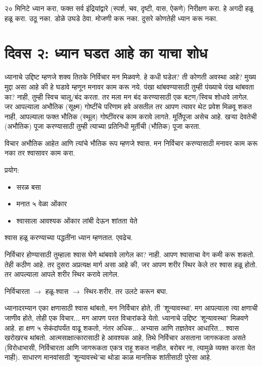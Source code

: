२० मिनिटे ध्यान करा, फक्त सर्व इंद्रियांद्वारे (स्पर्श, चव, दृष्टी, वास, ऐकणे) निरीक्षण करा. हे अगदी हळू हळू करा. उठू नका. डोळे उघडे ठेवा. मोजणी करू नका. दुसरे कोणतेही ध्यान करू नका.

\section*{दिवस २: ध्यान घडत आहे का याचा शोध}

ध्यानाचे उद्दिष्ट म्हणजे शक्य तितके निर्विचार मन मिळवणे. हे कधी घडेल? ती कोणती अवस्था आहे? मुख्य मुद्दा असा आहे की हे घडावे म्हणून मनावर काम करू नये. पंखा थांबवण्यासाठी तुम्ही पंख्याचे पंख थांबवता का? नाही, तुम्ही स्विच चालू/बंद करता. तर मला मन बंद करण्यासाठी एक बटण/स्विच शोधावे लागेल. जर आपल्याला अभौतिक (सूक्ष्म) गोष्टींचे परिणाम हवे असतील तर आपण त्यावर थेट प्रवेश मिळवू शकत नाही, आपल्याला फक्त भौतिक (स्थूल) गोष्टींवरच काम करावे लागते. मूर्तिपूजा असेच आहे. खर्‍या देवतेची (अभौतिक) पूजा करण्यासाठी तुम्ही त्याच्या प्रतिनिधी मूर्तीची (भौतिक) पूजा करता.

विचार अभौतिक आहेत आणि त्यांचे भौतिक रूप म्हणजे श्वास. मन निर्विचार करण्यासाठी मनावर काम करू नका तर श्वासावर काम करा.

प्रयोग:
\begin{itemize}
 \item सरळ बसा
 \item मनात ५ वेळा ओंकार
 \item श्वासाला आवश्यक ओंकार लांबी देऊन शांतता येते
\end{itemize}

श्वास हळू करण्याच्या पद्धतींना ध्यान म्हणतात. एवढेच.

निर्विचार होण्यासाठी तुम्हाला श्वास घेणे थांबवावे लागेल का? नाही. आपण श्वासाचा वेग कमी करू शकतो. तेही कठीण आहे. तर दुसरा अप्रत्यक्ष मार्ग असा आहे की, जर आपण शरीर स्थिर केले तर श्वास हळू होतो. तर आपल्याला आपले शरीर स्थिर करावे लागेल.

निर्विचारता $\rightarrow$ हळू-श्वास $\rightarrow$ स्थिर-शरीर. तर उलटे करून बघा.

ध्यानादरम्यान एका क्षणासाठी श्वास थांबतो, मन निर्विचार होते, ती 'शून्यावस्था'. मग आपल्याला त्या क्षणाची जाणीव होते, तोही एक विचार... मग आपण परत विचारांकडे येतो. ध्यानाचे उद्दिष्ट 'शून्यावस्था' मिळवणे आहे. हा क्षण ५ सेकंदांपर्यंत वाढू शकतो, नंतर अधिक... अभ्यास आणि तज्ञतेवर आधारित... श्वास खरोखरच थांबतो. आत्मसाक्षात्कारासाठी हे आवश्यक आहे, तिथे निर्विचार असताना जागरूकता असते (विरोधाभासी, निर्विचारता आणि जागरूकता एकत्र राहू शकत नाहीत, बरोबर ना, त्यामुळे व्यक्त करता येत नाही). साधारण मानवांसाठी 'शून्यावस्थे'चा थोडा काळ मानसिक शांतीसाठी पुरेसा आहे.

